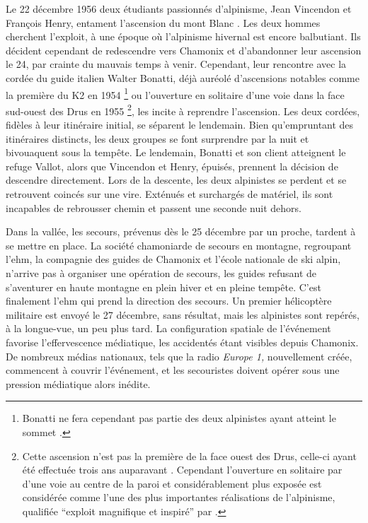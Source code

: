 Le 22 décembre 1956 deux étudiants passionnés d'alpinisme, Jean
Vincendon et François Henry, entament l’ascension du mont Blanc
\autocite{Ballu1997}. Les deux hommes cherchent l'exploit, à une
époque où l'alpinisme hivernal est encore balbutiant. Ils décident
cependant de redescendre vers Chamonix et d'abandonner leur ascension
le 24, par crainte du mauvais temps à venir. Cependant, leur rencontre
avec la cordée du guide italien Walter Bonatti, déjà auréolé
d'ascensions notables comme la première du K2 en 1954
\footnote{Bonatti ne fera cependant pas partie des deux alpinistes
  ayant atteint le sommet \autocite{ContributeursWikipedia2020a}.} ou
l'ouverture en solitaire d'une voie dans la face sud-ouest des Drus en
1955 \footnote{Cette ascension n'est pas la première de la face ouest
  des Drus, celle-ci ayant été effectuée trois ans auparavant
  \autocite{ContributeursWikipedia2020}. Cependant l'ouverture en
  solitaire par  d'une voie au centre de la paroi et
  considérablement plus exposée est considérée comme l'une des plus
  importantes réalisations de l'alpinisme, qualifiée
  \enquote{exploit magnifique et inspiré} par
  \textcite{Robbins2000}.}, les incite à reprendre l’ascension. Les
deux cordées, fidèles à leur itinéraire initial, se séparent le
lendemain. Bien qu'empruntant des itinéraires distincts, les deux
groupes se font surprendre par la nuit et bivouaquent sous la
tempête. Le lendemain, Bonatti et son client atteignent le refuge
Vallot, alors que Vincendon et Henry, épuisés, prennent la décision de
descendre directement. Lors de la descente, les deux alpinistes se
perdent et se retrouvent coincés sur une \gls{vire}. Exténués et
surchargés de matériel, ils sont incapables de rebrousser chemin et
passent une seconde nuit dehors.

Dans la vallée, les secours, prévenus dès le 25 décembre par un
proche, tardent à se mettre en place. La société chamoniarde de
secours en montagne, regroupant l'\ac{ehm}, la compagnie des guides de
Chamonix et l'école nationale de ski alpin, n'arrive pas à organiser
une opération de secours, les guides refusant de s'aventurer en haute
montagne en plein hiver et en pleine tempête. C'est finalement
l'\ac{ehm} qui prend la direction des secours. Un premier hélicoptère
militaire est envoyé le 27 décembre, sans résultat, mais les
alpinistes sont repérés, à la longue-vue, un peu plus tard. La
configuration spatiale de l'événement favorise l'effervescence
médiatique, les accidentés étant visibles depuis Chamonix. De nombreux
médias nationaux, tels que la radio \emph{Europe 1,} nouvellement
créée, commencent à couvrir l'événement, et les secouristes doivent
opérer sous une pression médiatique alors inédite.

